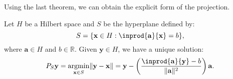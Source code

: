 \documentclass{huhtakm-template-book-v2}
\DeclareMathOperator*{\argmin}{argmin}
\begin{document}
    Using the last theorem, we can obtain the explicit form of the projection.
    \begin{thm}
        Let $H$ be a Hilbert space and $S$ be the hyperplane defined by:
        \begin{equation*}
            S = \{\mathbf{x}\in H:\inprod{\mathbf{a}}{\mathbf{x}} = b\},
        \end{equation*}
        where $\mathbf{a} \in H$ and $b \in \mathbb{R}$. Given $\mathbf{y} \in H$, we have a unique solution:
        \begin{equation*}
            P_{S}\mathbf{y} = \argmin_{\mathbf{x} \in S}\norm{\mathbf{y}-\mathbf{x}} = \mathbf{y} - \left(\frac{\inprod{\mathbf{a}}{\mathbf{y}}-b}{\norm{\mathbf{a}}^{2}}\right)\mathbf{a}.
        \end{equation*}
    \end{thm}
\end{document}
